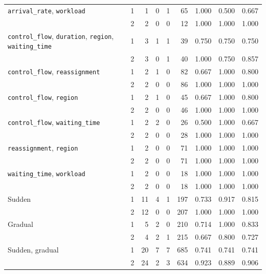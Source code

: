 \begin{table}[htbp]
\begin{tabular}{@{}>{\raggedright\arraybackslash}p{7.6cm}|r|r|r|r|r|r|r|r@{}}
		\texttt{arrival\_rate}, \texttt{workload} & 1 & 1 & 0 & 1 & 65 & 1.000 & 0.500 & 0.667 \\
		 & 2 & 2 & 0 & 0 & 12 & 1.000 & 1.000 & 1.000 \\
		\texttt{control\_flow}, \texttt{duration}, \texttt{region}, \texttt{waiting\_time} & 1 & 3 & 1 & 1 & 39 & 0.750 & 0.750 & 0.750 \\
		 & 2 & 3 & 0 & 1 & 40 & 1.000 & 0.750 & 0.857 \\
		\texttt{control\_flow}, \texttt{reassignment} & 1 & 2 & 1 & 0 & 82 & 0.667 & 1.000 & 0.800 \\
		 & 2 & 2 & 0 & 0 & 86 & 1.000 & 1.000 & 1.000 \\
		\texttt{control\_flow}, \texttt{region} & 1 & 2 & 1 & 0 & 45 & 0.667 & 1.000 & 0.800 \\
		 & 2 & 2 & 0 & 0 & 46 & 1.000 & 1.000 & 1.000 \\
		\texttt{control\_flow}, \texttt{waiting\_time} & 1 & 2 & 2 & 0 & 26 & 0.500 & 1.000 & 0.667 \\
		 & 2 & 2 & 0 & 0 & 28 & 1.000 & 1.000 & 1.000 \\
		\texttt{reassignment}, \texttt{region} & 1 & 2 & 0 & 0 & 71 & 1.000 & 1.000 & 1.000 \\
		 & 2 & 2 & 0 & 0 & 71 & 1.000 & 1.000 & 1.000 \\
		\texttt{waiting\_time}, \texttt{workload} & 1 & 2 & 0 & 0 & 18 & 1.000 & 1.000 & 1.000 \\
		 & 2 & 2 & 0 & 0 & 18 & 1.000 & 1.000 & 1.000 \\
		\hline
		Sudden & 1 & 11 & 4 & 1 & 197 & 0.733 & 0.917 & 0.815 \\
		 & 2 & 12 & 0 & 0 & 207 & 1.000 & 1.000 & 1.000 \\
		Gradual & 1 & 5 & 2 & 0 & 210 & 0.714 & 1.000 & 0.833 \\
		 & 2 & 4 & 2 & 1 & 215 & 0.667 & 0.800 & 0.727 \\
		Sudden, gradual & 1 & 20 & 7 & 7 & 685 & 0.741 & 0.741 & 0.741 \\
		 & 2 & 24 & 2 & 3 & 634 & 0.923 & 0.889 & 0.906 \\
		\hline
	\end{tabular}
\end{table}
